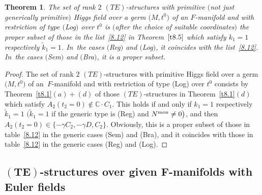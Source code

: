 \documentclass[pdftex]{sigma}%
\numberwithin{equation}{section}
\numberwithin{figure}{section}
\newcommand{\C}{{\mathbb C}}
\newcommand{\www}{\widetilde}
\newtheorem{Theorem}{Theorem}[section]
\begin{document}
\begin{Theorem}\label{t8.6}
The set of rank $2$ $(TE)$-structures
with primitive $($not just generically primitive$)$
Higgs field over a germ $\big(M,t^0\big)$
of an $F$-manifold and with restriction of type $($Log$)$ over $t^0$
is $($after the choice of suitable coordinates$)$
the proper subset of those in the list~\eqref{8.12}
in Theorem~$\ref{t8.5}$ which satisfy $k_1=1$
respectively $\www k_1=1$. In~the cases $($Reg$)$ and $($Log$)$, it coincides with
the list~\eqref{8.12}. In~the cases $($Sem$)$ and $($Bra$)$,
it is a proper subset.
\end{Theorem}

\begin{proof} The set of rank $2$ $(TE)$-structures
with primitive Higgs field over a germ $\big(M,t^0\big)$
of an~$F$-manifold and with restriction of type (Log) over $t^0$
consists by Theorem~\ref{t8.1}$(a){+}(d)$ of those
$(TE)$-structures in Theorem~\ref{t8.1}$(d)$
which satisfy $A_2(t_2=0)\notin\C\cdot C_1$.
This holds if and only if
$k_1=1$ respectively $\www k_1=1$
$\big(\www k_1=1$ if the generic type is (Reg) and $N^{\rm mon}\neq 0\big)$,
and then $A_2(t_2=0)\in\{-\gamma C_2,-\gamma D,C_2\}$.
Obviously, this is a proper
subset of those in table~\eqref{8.12} in the generic
cases (Sem) and (Bra), and it coincides with those
in table~\eqref{8.12} in the generic cases
(Reg) and (Log).
\end{proof}

\subsection[$(TE)$-structures over given $F$-manifolds with Euler fields]{$\boldsymbol{(TE)}$-structures over given $\boldsymbol{F}$-manifolds with Euler fields}\label{c8.2}
\end{document}
